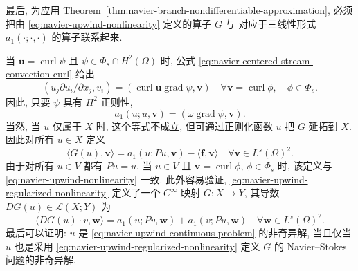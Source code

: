 最后, 为应用 Theorem~\ref{thm:navier-branch-nondifferentiable-approximation},
必须把由 \eqref{eq:navier-upwind-nonlinearity} 定义的算子 $G$ 与
对应于三线性形式 $a_1(\mathord\cdot;\mathord\cdot,\mathord\cdot)$ 的算子联系起来.

当 $\boldsymbol u=\operatorname{curl}\psi$ 且
$\psi\in\Phi_s\cap H^2(\Omega)$ 时, 公式
\eqref{eq:navier-centered-stream-convection-curl} 给出
\[
(u_j\partial u_i/\partial x_j,v_i)
=(\operatorname{curl}\boldsymbol u\operatorname{grad}\psi,\boldsymbol v)
\quad\forall\boldsymbol v=\operatorname{curl}\phi,
\quad\phi\in\Phi_s.
\]
因此, 只要 $\psi$ 具有 $H^2$ 正则性,
\[
a_1(u;u,\boldsymbol v)=(\omega\operatorname{grad}\psi,\boldsymbol v).
\]
当然, 当 $u$ 仅属于 $X$ 时, 这个等式不成立, 但可通过正则化函数 $u$ 把 $G$ 延拓到 $X$.
因此对所有 $u\in X$ 定义
\begin{equation}\label{eq:navier-upwind-regularized-nonlinearity}
\langle G(u),\boldsymbol v\rangle
=a_1(u;Pu,\boldsymbol v)-\langle\boldsymbol f,\boldsymbol v\rangle
\quad\forall\boldsymbol v\in L^s(\Omega)^2.
\end{equation}
由于对所有 $u\in V$ 都有 $Pu=u$, 当 $u\in V$ 且
$\boldsymbol v=\operatorname{curl}\phi$, $\phi\in\Phi_s$ 时,
该定义与 \eqref{eq:navier-upwind-nonlinearity} 一致. 此外容易验证,
\eqref{eq:navier-upwind-regularized-nonlinearity} 定义了一个
$C^\infty$ 映射 $G:X\to Y$, 其导数
$DG(u)\in\mathcal L(X;Y)$ 为
\begin{equation}\label{eq:navier-upwind-regularized-derivative}
\langle DG(u)\cdot v,\boldsymbol w\rangle
=a_1(u;Pv,\boldsymbol w)+a_1(v;Pu,\boldsymbol w)
\quad\forall\boldsymbol w\in L^s(\Omega)^2.
\end{equation}
最后可以证明: $u$ 是 \eqref{eq:navier-upwind-continuous-problem} 的非奇异解,
当且仅当 $u$ 也是采用 \eqref{eq:navier-upwind-regularized-nonlinearity}
定义 $G$ 的 Navier--Stokes 问题的非奇异解.

